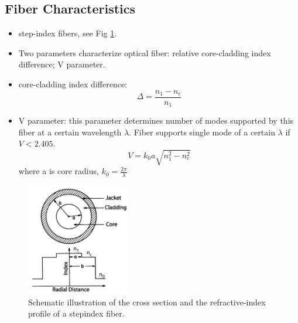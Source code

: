 \documentclass[12pt]{extarticle}
\newcommand{\<}{\langle}
\renewcommand{\>}{\rangle}
\theoremstyle{definition}
\begin{document}
    \subsection{Fiber Characteristics}
        \begin{itemize}
            \item step-index fibers, see Fig \ref{fig1.1}.
            \item Two parameters characterize optical fiber: relative core-cladding index difference; V parameter.
            \item core-cladding index difference:
                \begin{equation}
                    \Delta = \frac{n_1 - n_c}{n_1}
                    \label{core-cladding index difference}
                \end{equation}
            \item V parameter: this parameter determines number of modes supported by this fiber at a certain wavelength $\lambda$. Fiber supports single mode of a certain $\lambda$ if $V < 2.405$.
                \begin{equation}
                    V = k_0 a \sqrt{n_1^2 - n_c^2}
                    \label{V parameter}
                \end{equation}
            where a is core radius, $k_0 = \frac{2\pi}{\lambda}$
        \end{itemize}
    
        \begin{figure}[htbp]
            \centering
            \includegraphics[width=0.4\textwidth]{images/fig1.1.PNG}
            \caption{Schematic illustration of the cross section and the refractive-index proﬁle of a stepindex ﬁber.}
            \label{fig1.1}
        \end{figure}
        
\end{document}
